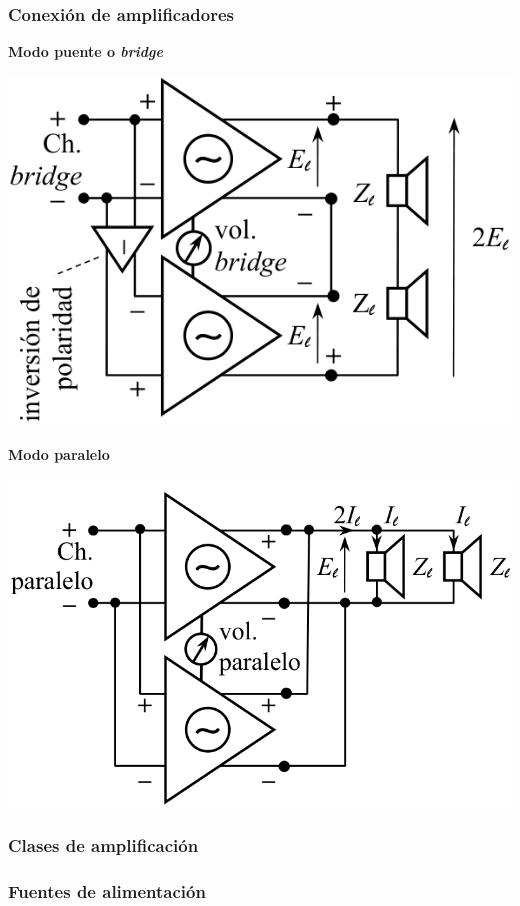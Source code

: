 \documentclass[a4paper, 8pt]{extarticle}
\begin{document}
\begin{multicols}{3}
  \subsubsection{Conexión de amplificadores}
  \begin{center}
    \textbf{Modo puente o \textit{bridge}}

    \includegraphics[width=0.5\linewidth]{Amp-bridge.png}

    \vspace{5pt}
    \textbf{Modo paralelo}

    \includegraphics[width=0.5\linewidth]{Amp-paralelo.png}
  \end{center}
  \subsubsection{Clases de amplificación}
  \subsubsection{Fuentes de alimentación}

\end{multicols}
\end{document}
